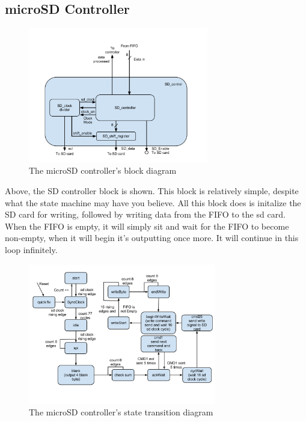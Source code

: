 \documentclass[12pt,letter,oneside]{report}
\begin{document}
\subsection{microSD Controller}
\begin{figure}[h!]
	\centering
	\caption{The microSD controller's block diagram}
	\includegraphics[width=0.70\textwidth]{sdBlock}
\end{figure}
Above, the SD controller block is shown. This block is relatively simple, despite what the state machine may have you believe. All this block does is initalize the SD card for writing, followed by writing data from the FIFO to the sd card. When the FIFO is empty, it will simply sit and wait for the FIFO to become non-empty, when it will begin it's outputting once more. It will continue in this loop infinitely.
\begin{figure}[h!]
	\centering
	\caption{The microSD controller's state transition diagram}
	\includegraphics[width=0.73\textwidth]{sdTrans}
\end{figure}
\end{document}
